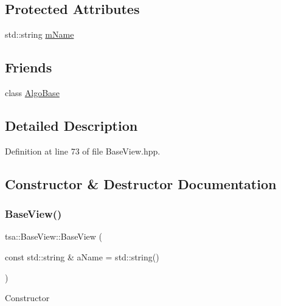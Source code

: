 \subsection*{Protected Attributes}
\begin{DoxyCompactItemize}
\item 
std\+::string \hyperlink{classtsa_1_1_base_view_a91429dee1249c140160bfca20e783019}{m\+Name}
\end{DoxyCompactItemize}
\subsection*{Friends}
\begin{DoxyCompactItemize}
\item 
class \hyperlink{classtsa_1_1_base_view_af7b68757603d571922c4e3cce401ec9f}{Algo\+Base}
\end{DoxyCompactItemize}


\subsection{Detailed Description}


Definition at line 73 of file Base\+View.\+hpp.



\subsection{Constructor \& Destructor Documentation}
\mbox{\label{classtsa_1_1_base_view_a87ba8f0c139190b95f8b1c5486b342d1}} 
\subsubsection{\texorpdfstring{Base\+View()}{BaseView()}\hspace{0.1cm}{\footnotesize\ttfamily [1/2]}}
{\footnotesize\ttfamily tsa\+::\+Base\+View\+::\+Base\+View (\begin{DoxyParamCaption}\item[{const std\+::string \&}]{a\+Name = {\ttfamily std\+:\+:string()} }\end{DoxyParamCaption})\hspace{0.3cm}{\ttfamily [inline]}}

Constructor 

